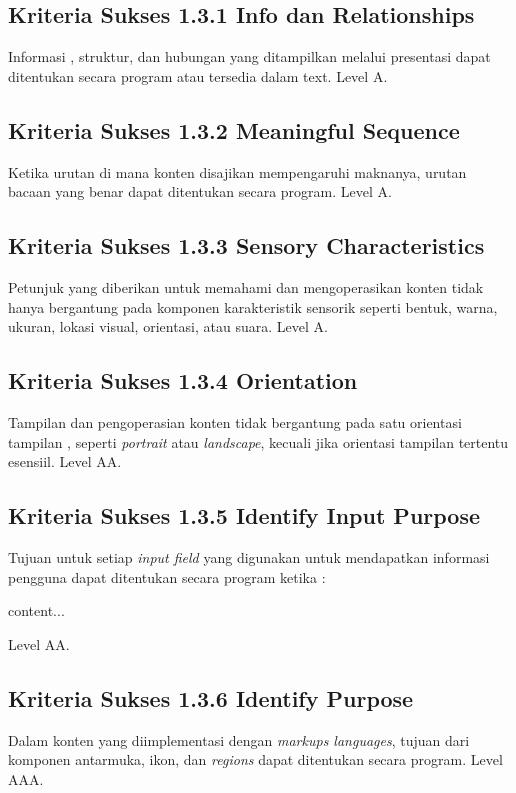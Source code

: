 {\subsection{Kriteria Sukses 1.3.1 Info dan Relationships}
\label{sec:kriteria_1.3.1}
Informasi , struktur, dan hubungan yang ditampilkan melalui presentasi dapat ditentukan secara program atau tersedia dalam text.
Level A.

\subsection{Kriteria Sukses 1.3.2 Meaningful Sequence}
\label{sec:kriteria_1.3.2}
Ketika urutan di mana konten disajikan mempengaruhi maknanya, urutan bacaan yang benar dapat ditentukan secara program.
Level A.

\subsection{Kriteria Sukses 1.3.3 Sensory Characteristics}
\label{sec:kriteria_1.3.3}
Petunjuk yang diberikan untuk memahami dan mengoperasikan konten tidak hanya bergantung pada komponen karakteristik sensorik seperti bentuk, warna, ukuran, lokasi visual, orientasi, atau suara.
Level A.

\subsection{Kriteria Sukses 1.3.4 Orientation}
\label{sec:kriteria_1.3.4}
Tampilan dan pengoperasian konten tidak bergantung pada satu orientasi tampilan , seperti \textit{portrait} atau \textit{landscape}, kecuali jika orientasi tampilan tertentu esensiil.
Level AA.

\subsection{Kriteria Sukses 1.3.5 Identify Input Purpose}
\label{sec:kriteria_1.3.5}
Tujuan untuk setiap \textit{input field} yang digunakan untuk mendapatkan informasi pengguna dapat ditentukan secara program ketika :
\begin{itemize}
	content...
\end{itemize}
Level AA.

\subsection{Kriteria Sukses 1.3.6 Identify Purpose}
\label{sec:kriteria_1.3.6}
Dalam konten yang diimplementasi dengan \textit{markups languages}, tujuan dari komponen antarmuka, ikon, dan \textit{regions} dapat ditentukan secara program.
Level AAA.

}
